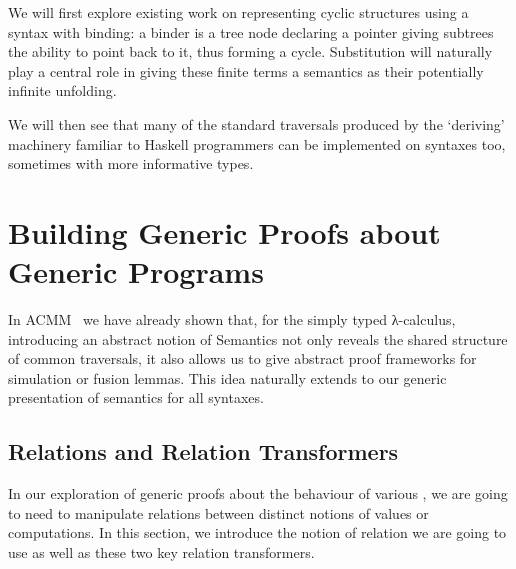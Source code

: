 We will first explore existing work on representing cyclic structures
using a syntax with binding: a binder is a tree node declaring a pointer
giving subtrees the ability to point back to it, thus forming a cycle.
Substitution will naturally play a central role in giving these finite
terms a semantics as their potentially infinite unfolding.

We will then see that many of the standard traversals produced by the
`deriving' machinery familiar to Haskell programmers can be implemented
on syntaxes too, sometimes with more informative types.





\section{Building Generic Proofs about Generic Programs}

In ACMM~\citeyear{allais2017type} we have
already shown that, for the simply typed λ-calculus, introducing an abstract
notion of Semantics not only reveals the shared structure of common
traversals, it also allows us to give abstract proof frameworks for
simulation or fusion lemmas. This idea naturally extends to our generic
presentation of semantics for all syntaxes.


\subsection{Relations and Relation Transformers}

In our exploration of generic proofs about the behaviour of various ,
we are going to need to manipulate relations between distinct notions of values or
computations. In this section, we introduce the notion of relation we are going to
use as well as these two key relation transformers.

